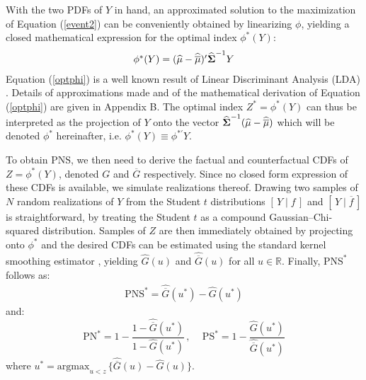 \documentclass[12pt]{article}
\newcommand{\Sig}{\mbox{\boldmath \(\Sigma\)}}
\newcommand{\PN}{\textrm{PN}}
\newcommand{\PS}{\textrm{PS}}
\newcommand{\PNS}{\textrm{PNS}}
\begin{document}
With the two PDFs of $Y$ in hand, an approximated solution to the maximization of Equation (\ref{event2}) can be conveniently obtained by linearizing $\phi$, yielding a closed mathematical expression for the optimal index $\phi^*(Y)$:
\begin{equation} 
\label{optphi}
\begin{array}{ll}
\phi^*(Y) = (\widehat{\mu}-\widehat{\overline{\mu}})'\widehat{\Sig}^{-1}Y
\end{array}
\end{equation}
Equation (\ref{optphi}) is a well known result of Linear Discriminant Analysis (LDA) \citep{McLachlan04}. Details of approximations made and of the mathematical derivation of Equation (\ref{optphi}) are given in Appendix B. The optimal index $Z^*=\phi^*(Y)$ can thus be interpreted as the projection of $Y$ onto the vector $\widehat{\Sig}^{-1}(\widehat{\mu}-\widehat{\overline{\mu}})$ which will be denoted $\phi^*$ hereinafter, i.e. $\phi^*(Y)\equiv \phi^{*'}Y$.

To obtain $\PNS$, we then need to derive the factual and counterfactual CDFs of $Z=\phi^*(Y)$, denoted $G$ and $\overline G$ respectively. Since no closed form expression of these CDFs is available, we simulate realizations thereof. Drawing two samples of $N$ random realizations of $Y$ from the Student $t$ distributions $\left[\, Y\mid f\,\right]$ and $\left[\, Y\mid \overline{f}\,\right]$ is straightforward, by treating the Student $t$ as a compound Gaussian--Chi-squared distribution. Samples of $Z$ are then immediately obtained by projecting onto $\phi^*$ and the desired CDFs can be estimated using the standard kernel smoothing estimator \citep{BA97}, yielding $\widehat{G}(u)$ and $\widehat{\overline G}(u)$ for all $u\in\mathbb R$. Finally, $\PNS^*$ follows as:
\begin{equation}
\label{pns}
\begin{array}{ll}
\PNS^* = \widehat{\overline G}(u^*)-\widehat{G}(u^*)
\end{array}
\end{equation}
and:
\begin{equation}
\label{pn_ps}
\PN^* = 1-\frac{1-\widehat{\overline G}(u^*)}{1-\widehat{G}(u^*)}\,,\,\,\,\,\,\,\,\PS^* = 1-\frac{\widehat{G}(u^*)}{\widehat{\overline G}(u^*)}
\end{equation}
where $u^*=\textrm{argmax}_{u< z}\, \{\widehat{\overline G}(u)-\widehat{G}(u)\}$.
\end{document}
